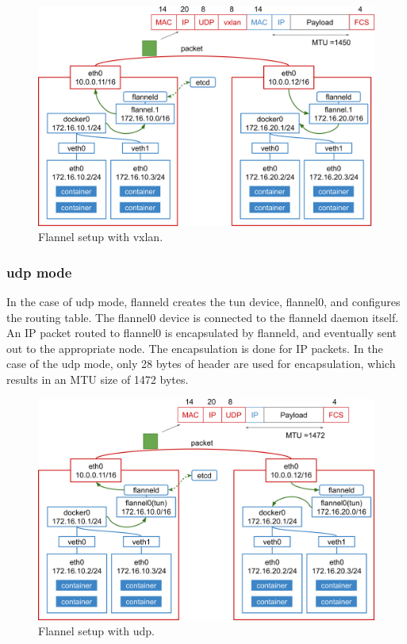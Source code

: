 \begin{figure}[h]
  \centering
  \includegraphics[width=0.8\columnwidth]{Figs/flannel-vxlan}

  \par\bigskip
  \centering
  \begin{minipage}{0.9\columnwidth}
    \caption[Flannel setup with vxlan]{
      Flannel setup with vxlan.
    }
    \label{Figs/flannel-vxlan}
  \end{minipage}
\end{figure}

\subsubsection{udp mode}

In the case of udp mode, flanneld creates the tun device, flannel0, and configures the routing table.
The flannel0 device is connected to the flanneld daemon itself.
An IP packet routed to flannel0 is encapsulated by flanneld, and eventually sent out 
to the appropriate node. 
The encapsulation is done for IP packets.
In the case of the udp mode, only 28 bytes of header are used for encapsulation, which results in an MTU size of 1472 bytes.

\begin{figure}[h]
  \centering
  \includegraphics[width=0.8\columnwidth]{Figs/flannel-udp}

  \par\bigskip
  \centering
  \begin{minipage}{0.9\columnwidth}
    \caption[Flannel setup with udp]{
      Flannel setup with udp.
    }
    \label{Figs/flannel-udp}
  \end{minipage}
\end{figure}

